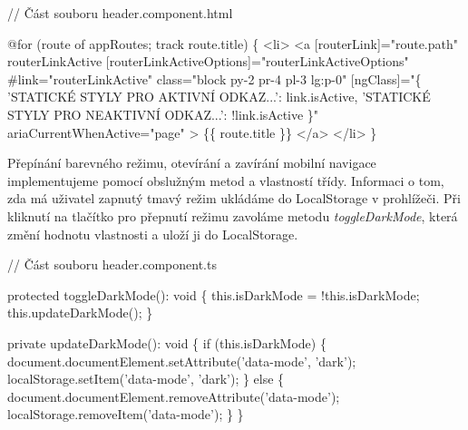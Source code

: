 \begin{prog}
// Část souboru header.component.html

@for (route of appRoutes; track route.title) \{
  <li>
    <a
      [routerLink]="route.path"
      routerLinkActive
      [routerLinkActiveOptions]="routerLinkActiveOptions"
      #link="routerLinkActive"
      class="block py-2 pr-4 pl-3 lg:p-0"
      [ngClass]="\{
        'STATICKÉ STYLY PRO AKTIVNÍ ODKAZ...': link.isActive,
        'STATICKÉ STYLY PRO NEAKTIVNÍ ODKAZ...': !link.isActive
      \}"
      ariaCurrentWhenActive="page"
    >
      \{\{ route.title \}\}
    </a>
  </li>
\}
\end{prog}

Přepínání barevného režimu, otevírání a zavírání mobilní navigace implementujeme pomocí obslužným metod a vlastností třídy. 
Informaci o tom, zda má uživatel zapnutý tmavý režim ukládáme do LocalStorage v prohlížeči. 
Při kliknutí na tlačítko pro přepnutí režimu zavoláme metodu \emph{toggleDarkMode}, která změní hodnotu vlastnosti a uloží ji do LocalStorage.

\begin{prog}
// Část souboru header.component.ts

protected toggleDarkMode(): void \{
  this.isDarkMode = !this.isDarkMode;
  this.updateDarkMode();
\}

private updateDarkMode(): void \{
  if (this.isDarkMode) \{
    document.documentElement.setAttribute('data-mode', 'dark');
    localStorage.setItem('data-mode', 'dark');
  \} else \{
    document.documentElement.removeAttribute('data-mode');
    localStorage.removeItem('data-mode');
  \}
\}
\end{prog}